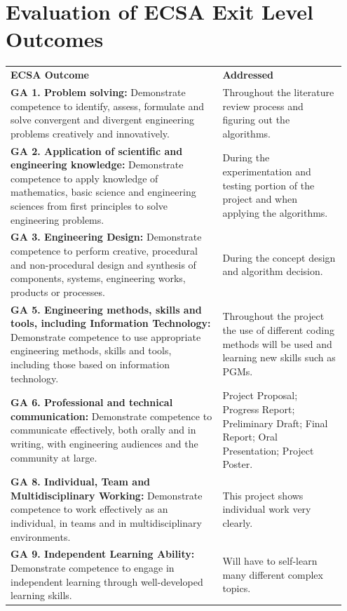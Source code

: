 \documentclass[12pt,a4paper]{article}
\begin{document}
\section*{Evaluation of ECSA Exit Level Outcomes}
\renewcommand{\arraystretch}{3} %

\begin{longtable}{|p{0.6\linewidth}|p{0.35\linewidth}|}
\hline
\rowcolor{gray!30}
\multicolumn{2}{|c|}{\textbf{ECSA Outcomes Assessed in this Module}} \\
\hline
\textbf{ECSA Outcome} & \textbf{Addressed} \\
\hline
\textbf{GA 1. Problem solving:} Demonstrate competence to identify, assess, formulate and solve convergent and divergent engineering problems creatively and innovatively. & Throughout the literature review process and figuring out the algorithms. \\
\hline
\textbf{GA 2. Application of scientific and engineering knowledge:} Demonstrate competence to apply knowledge of mathematics, basic science and engineering sciences from first principles to solve engineering problems. & During the experimentation and testing portion of the project and when applying the algorithms. \\
\hline
\textbf{GA 3. Engineering Design:} Demonstrate competence to perform creative, procedural and non-procedural design and synthesis of components, systems, engineering works, products or processes. & During the concept design and algorithm decision. \\
\hline
\textbf{GA 5. Engineering methods, skills and tools, including Information Technology:} Demonstrate competence to use appropriate engineering methods, skills and tools, including those based on information technology. & Throughout the project the use of different coding methods will be used and learning new skills such as PGMs. \\
\hline
\textbf{GA 6. Professional and technical communication:} Demonstrate competence to communicate effectively, both orally and in writing, with engineering audiences and the community at large. & Project Proposal; Progress Report; Preliminary Draft; Final Report; Oral Presentation; Project Poster. \\
\hline
\textbf{GA 8. Individual, Team and Multidisciplinary Working:} Demonstrate competence to work effectively as an individual, in teams and in multidisciplinary environments. & This project shows individual work very clearly. \\
\hline
\textbf{GA 9. Independent Learning Ability:} Demonstrate competence to engage in independent learning through well-developed learning skills. & Will have to self-learn many different complex topics. \\
\hline
\end{longtable}
\newpage
\end{document}
